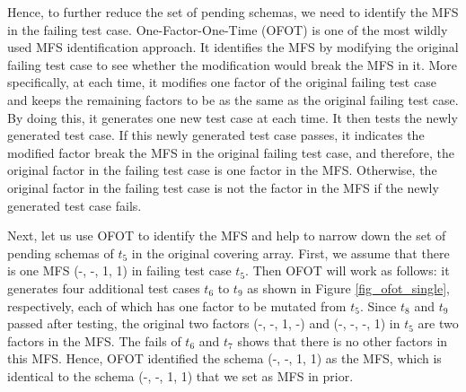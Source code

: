 Hence, to further reduce the set of pending schemas, we need to identify the MFS in the failing test case. One-Factor-One-Time (OFOT) \cite{nie2011minimal} is one of the most wildly used MFS identification approach. It identifies the MFS by modifying the original failing test case to see whether the modification would break the MFS in it. More specifically, at each time, it modifies one factor of the original failing test case and keeps the remaining factors to be as the same as the original failing test case. By doing this, it generates one new test case at each time. It then tests the newly generated test case. If this newly generated test case passes, it indicates the modified factor break the MFS in the original failing test case, and therefore, the original factor in the failing test case is one factor in the MFS. Otherwise, the original factor in the failing test case is not the factor in the MFS if the newly generated test case fails.

Next, let us use OFOT to identify the MFS and help to narrow down the set of pending schemas of $t_{5}$ in the original covering array. First, we assume that there is one MFS (-, -, 1, 1) in failing test case $t_{5}$.  Then OFOT will work as follows: it generates four additional test cases $t_{6}$ to $t_{9}$ as shown in Figure \ref{fig_ofot_single}, respectively, each of which has one factor to be mutated from $t_{5}$.  Since $t_{8}$ and $t_{9}$ passed after testing, the original two factors (-, -, 1, -) and (-, -, -, 1) in $t_{5}$ are two factors in the MFS. The fails of $t_{6}$ and $t_{7}$ shows that there is no other factors in this MFS. Hence, OFOT identified the schema (-, -, 1, 1) as the MFS, which is identical to the schema (-, -, 1, 1) that we set as MFS in prior.


